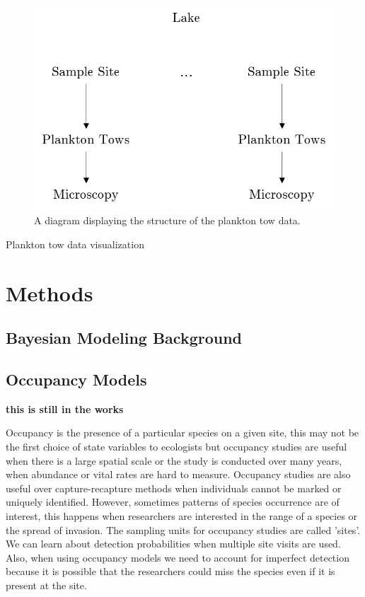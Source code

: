 \documentclass[12pt]{article}\usepackage[]{graphicx}\usepackage[]{color}
\begin{document}
\begin{figure}[]
	\centering
	\includegraphics[scale = 0.7]{planktontow}
	\caption{A diagram displaying the structure of the plankton tow data.}
	\label{tab:tow_diagram}
\end{figure}

Plankton tow data visualization

\section{Methods}

\subsection{Bayesian Modeling Background}

\subsection{Occupancy Models}

\textbf{this is still in the works}

Occupancy is the presence of a particular species on a given site, this may not be the first choice of state variables to ecologists but occupancy studies are useful when there is a large spatial scale or the study is conducted over many years, when abundance or vital rates are hard to measure. Occupancy studies are also useful over capture-recapture methods when individuals cannot be marked or uniquely identified. However, sometimes patterns of species occurrence are of interest, this happens when researchers are interested in the range of a species or the spread of invasion. The sampling units for occupancy studies are called 'sites'. We can learn about detection probabilities when multiple site visits are used. Also, when using occupancy models we need to account for imperfect detection because it is possible that the researchers could miss the species even if it is present at the site. 
\end{document}
